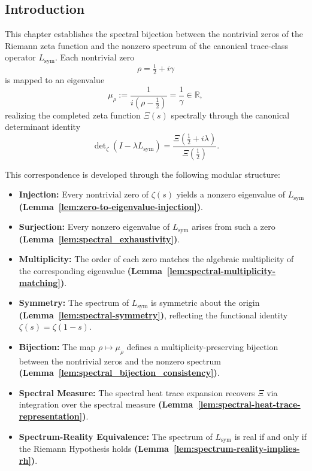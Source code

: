\subsection*{Introduction}

This chapter establishes the spectral bijection between the nontrivial zeros of the Riemann zeta function and the nonzero spectrum of the canonical trace-class operator \( L_{\mathrm{sym}} \). Each nontrivial zero
\[
\rho = \tfrac{1}{2} + i\gamma
\]
is mapped to an eigenvalue
\[
\mu_\rho := \frac{1}{i(\rho - \tfrac{1}{2})} = \frac{1}{\gamma} \in \mathbb{R},
\]
realizing the completed zeta function \( \Xi(s) \) spectrally through the canonical determinant identity
\[
\det\nolimits_\zeta(I - \lambda L_{\mathrm{sym}}) = \frac{\Xi\left( \tfrac{1}{2} + i\lambda \right)}{\Xi\left( \tfrac{1}{2} \right)}.
\]

\medskip
\noindent
This correspondence is developed through the following modular structure:
\begin{itemize}
  \item \textbf{Injection:} Every nontrivial zero of \( \zeta(s) \) yields a nonzero eigenvalue of \( L_{\mathrm{sym}} \) \textbf{(Lemma~\ref{lem:zero-to-eigenvalue-injection})}.
  \item \textbf{Surjection:} Every nonzero eigenvalue of \( L_{\mathrm{sym}} \) arises from such a zero \textbf{(Lemma~\ref{lem:spectral_exhaustivity})}.
  \item \textbf{Multiplicity:} The order of each zero matches the algebraic multiplicity of the corresponding eigenvalue \textbf{(Lemma~\ref{lem:spectral-multiplicity-matching})}.
  \item \textbf{Symmetry:} The spectrum of \( L_{\mathrm{sym}} \) is symmetric about the origin \textbf{(Lemma~\ref{lem:spectral-symmetry})}, reflecting the functional identity \( \zeta(s) = \zeta(1 - s) \).
  \item \textbf{Bijection:} The map \( \rho \mapsto \mu_\rho \) defines a multiplicity-preserving bijection between the nontrivial zeros and the nonzero spectrum \textbf{(Lemma~\ref{lem:spectral_bijection_consistency})}.
  \item \textbf{Spectral Measure:} The spectral heat trace expansion recovers \( \Xi \) via integration over the spectral measure \textbf{(Lemma~\ref{lem:spectral-heat-trace-representation})}.
  \item \textbf{Spectrum-Reality Equivalence:} The spectrum of \( L_{\mathrm{sym}} \) is real if and only if the Riemann Hypothesis holds \textbf{(Lemma~\ref{lem:spectrum-reality-implies-rh})}.
\end{itemize}

